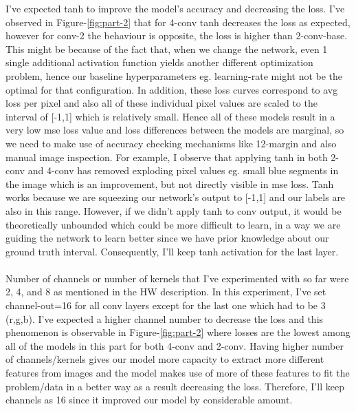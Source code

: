 \documentclass[12pt]{article}
\begin{document}
\begin{center}
        I've expected tanh to improve the model's accuracy and decreasing the loss. I've observed in Figure-\ref*{fig:part-2} that
        for 4-conv tanh decreases the loss as expected, however for conv-2 the behaviour is opposite, the loss is higher than 2-conv-base.
        This might be because of the fact that, when we change the network, even 1 single additional activation function yields another different optimization problem,
        hence our baseline hyperparameters eg. learning-rate might not be the optimal for that configuration.
        In addition, these loss curves correspond to avg loss per pixel and also all of these individual pixel values are scaled to the interval of [-1,1]  which is relatively small. Hence all of these models result in a very low mse loss value
        and loss differences between the models are marginal, so we need to make use of accuracy checking mechanisms like 12-margin and also manual image inspection.
        For example, I observe that applying tanh in both 2-conv and 4-conv has removed exploding pixel values eg. small blue segments in the image which is an improvement, but not directly visible in mse loss.
        Tanh works because we are squeezing our network's output to [-1,1] and our labels are also in this range. However, if we didn't apply tanh to conv output, it would be theoretically unbounded
        which could be more difficult to learn, in a way we are guiding the network to learn better since we have prior knowledge about our ground truth interval.
        Consequently, I'll keep tanh activation for the last layer. 
        \\~\\

        Number of channels or number of kernels that I've experimented with so far were 2, 4, and 8 as mentioned in the HW description.
        In this experiment, I've set channel-out=16 for all conv layers except for the last one which had to be 3 (r,g,b).
        I've expected a higher channel number to decrease the loss and this phenomenon is observable in Figure-\ref*{fig:part-2} where
        losses are the lowest among all of the models in this part for both 4-conv and 2-conv.
        Having higher number of channels/kernels gives our model more capacity to extract more different features from images
        and the model makes use of more of these features to fit the problem/data in a better way as a result decreasing the loss.
        Therefore, I'll keep channels as 16 since it improved our model by considerable amount. 


    \end{center}
\end{document}
